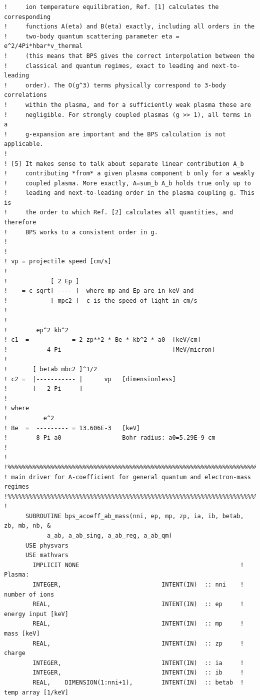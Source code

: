 \documentclass[preprint,12pt,eqsecnum,nofootinbib,amsmath,amssymb]{revtex4}
\begin{document}
{\begin{verbatim}
!     ion temperature equilibration, Ref. [1] calculates the corresponding
!     functions A(eta) and B(eta) exactly, including all orders in the 
!     two-body quantum scattering parameter eta = e^2/4Pi*hbar*v_thermal 
!     (this means that BPS gives the correct interpolation between the 
!     classical and quantum regimes, exact to leading and next-to-leading 
!     order). The O(g^3) terms physically correspond to 3-body correlations 
!     within the plasma, and for a sufficiently weak plasma these are 
!     negligible. For strongly coupled plasmas (g >> 1), all terms in a 
!     g-expansion are important and the BPS calculation is not applicable.
!
! [5] It makes sense to talk about separate linear contribution A_b
!     contributing *from* a given plasma component b only for a weakly 
!     coupled plasma. More exactly, A=sum_b A_b holds true only up to 
!     leading and next-to-leading order in the plasma coupling g. This is 
!     the order to which Ref. [2] calculates all quantities, and therefore 
!     BPS works to a consistent order in g.
!
!
! vp = projectile speed [cm/s]
!
!            [ 2 Ep ]
!    = c sqrt[ ---- ]  where mp and Ep are in keV and
!            [ mpc2 ]  c is the speed of light in cm/s
!
!
!        ep^2 kb^2
! c1  =  --------- = 2 zp**2 * Be * kb^2 * a0  [keV/cm]
!           4 Pi                               [MeV/micron]
!
!       [ betab mbc2 ]^1/2  
! c2 =  |----------- |      vp   [dimensionless]
!       [   2 Pi     ]      
!        
! where
!          e^2 
! Be  =  --------- = 13.606E-3   [keV]
!        8 Pi a0                 Bohr radius: a0=5.29E-9 cm
!
!
!%%%%%%%%%%%%%%%%%%%%%%%%%%%%%%%%%%%%%%%%%%%%%%%%%%%%%%%%%%%%%%%%%%%%%%%%%%%%
! main driver for A-coefficient for general quantum and electron-mass regimes
!%%%%%%%%%%%%%%%%%%%%%%%%%%%%%%%%%%%%%%%%%%%%%%%%%%%%%%%%%%%%%%%%%%%%%%%%%%%%
!
      SUBROUTINE bps_acoeff_ab_mass(nni, ep, mp, zp, ia, ib, betab, zb, mb, nb, &
            a_ab, a_ab_sing, a_ab_reg, a_ab_qm)
      USE physvars
      USE mathvars    
        IMPLICIT NONE                                             ! Plasma:
        INTEGER,                            INTENT(IN)  :: nni    !  number of ions
        REAL,                               INTENT(IN)  :: ep     !  energy input [keV]
        REAL,                               INTENT(IN)  :: mp     !  mass [keV]
        REAL,                               INTENT(IN)  :: zp     !  charge
        INTEGER,                            INTENT(IN)  :: ia     !  
        INTEGER,                            INTENT(IN)  :: ib     !  
        REAL,    DIMENSION(1:nni+1),        INTENT(IN)  :: betab  !  temp array [1/keV]

\end{verbatim}}
\end{document}
